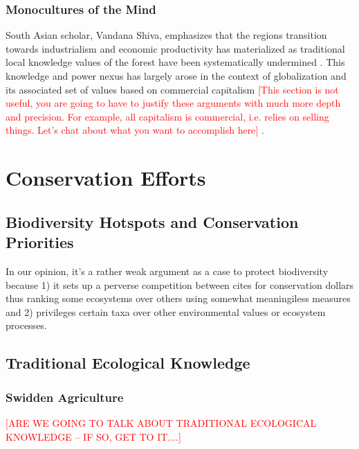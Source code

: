 \subsubsection{Monocultures of the Mind}
South Asian scholar, Vandana Shiva, emphasizes that the regions transition towards industrialism and economic productivity has materialized as traditional local knowledge values of the forest have been systematically undermined \citep{shiva1993monocultures}. This knowledge and power nexus has largely arose in the context of globalization and its associated set of values based on commercial capitalism \textcolor{red}{[This section is not useful, you are going to have to justify these arguments with much more depth and precision. For example, all capitalism is commercial, i.e. relies on selling things. Let's chat about what you want to accomplish here]} \citealp{king1993politik}.

\section{Conservation Efforts}

\subsection{Biodiversity Hotspots and Conservation Priorities}  

In our opinion, it's a rather weak argument as a case to protect biodiversity because 1) it sets up a perverse competition between cites for conservation dollars thus ranking some ecosystems over others using somewhat meaningiless measures and 2) privileges certain taxa over other environmental values or ecosystem processes.

\subsection{Traditional Ecological Knowledge}

\subsubsection{Swidden Agriculture}

\textcolor{red}{[ARE WE GOING TO TALK ABOUT TRADITIONAL ECOLOGICAL KNOWLEDGE -- IF SO, GET TO IT....]}

